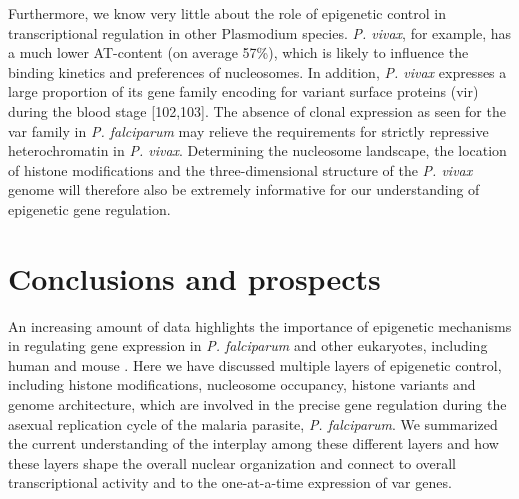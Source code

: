 Furthermore, we know very little about the role of epigenetic control in
transcriptional regulation in other Plasmodium species. \textit{P. vivax}, for example,
has a much lower AT-content (on average 57\%), which is likely to influence the
binding kinetics and preferences of nucleosomes. In addition, \textit{P.
vivax}
expresses a large proportion of its gene family encoding for variant surface
proteins (vir) during the blood stage \citep{bozdech:transcriptome,
fernandez-becerra:variant} [102,103]. The absence of clonal
expression as seen for the var family in \textit{P. falciparum} may relieve the
requirements for strictly repressive heterochromatin in \textit{P. vivax}. Determining
the nucleosome landscape, the location of histone modifications and the
three-dimensional structure of the \textit{P. vivax} genome will therefore also be
extremely informative for our understanding of epigenetic gene regulation.


\section{Conclusions and prospects}
An increasing amount of data highlights the importance of epigenetic
mechanisms in regulating gene expression in \textit{P. falciparum} and other
eukaryotes, including human and mouse \citep{ay:three-dimensional,
dixon:topological, duan:three-dimensional, lemieux:genome-wide,
lieberman-aiden:comprehensive, sexton:three-dimensional}.
Here we have discussed multiple
layers of epigenetic control, including histone modifications, nucleosome
occupancy, histone variants and genome architecture, which are involved in the
precise gene regulation during the asexual replication cycle of the malaria
parasite, \textit{P. falciparum}. We summarized the current understanding of the
interplay among these different layers and how these layers shape the overall
nuclear organization and connect to overall transcriptional activity and to
the one-at-a-time expression of var genes.

